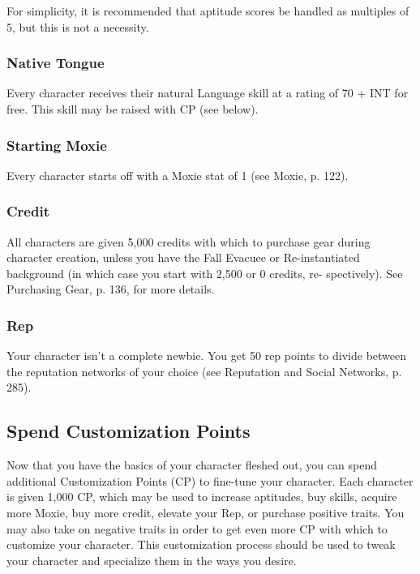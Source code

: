 For simplicity, it is recommended that aptitude scores be handled as multiples of 5, but this is not a necessity.

\subsubsection{Native Tongue}
\label{sec:native-tongue}

Every character receives their natural Language skill at a rating of 70 + INT for free. This skill may be raised with CP (see below).

\subsubsection{Starting Moxie}
\label{sec:starting-moxie}

Every character starts off with a Moxie stat of 1 (see Moxie, p. 122).

\subsubsection{Credit}
\label{sec:starting-credit}

All characters are given 5,000 credits with which to purchase gear during character creation, unless you have the Fall Evacuee or Re-instantiated background (in which case you start with 2,500 or 0 credits, re- spectively). See Purchasing Gear, p. 136, for more details.

\subsubsection{Rep}
\label{sec:starting-rep}
Your character isn’t a complete newbie. You get 50 rep points to divide between the reputation networks of your choice (see Reputation and Social Networks, p. 285).

\subsection{Spend Customization Points} 
\label{sec:spend-customization-points}
Now that you have the basics of your character fleshed out, you can spend additional Customization Points (CP) to fine-tune your character. Each character is given 1,000 CP, which may be used to increase aptitudes, buy skills, acquire more Moxie, buy more credit, elevate your Rep, or purchase positive traits. You may also take on negative traits in order to get even more CP with which to customize your character. This customization process should be used to tweak your character and specialize them in the ways you desire.

